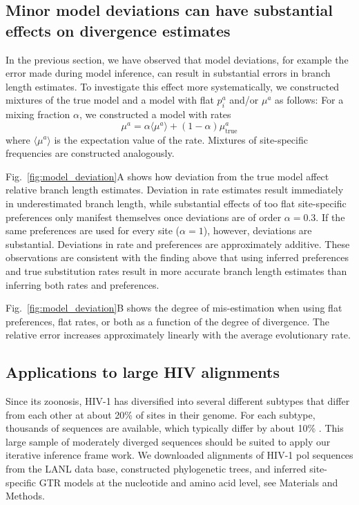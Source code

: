 \documentclass[aps,rmp,twocolumn,linenumbers]{revtex4-1}
\newcommand{\eqp}{p}
\begin{document}
\subsection*{Minor model deviations can have substantial effects on divergence estimates}
In the previous section, we have observed that model deviations, for example the error made during model inference, can result in substantial errors in branch length estimates.
To investigate this effect more systematically, we constructed mixtures of the true model and a model with flat $\eqp_i^a$ and/or $\mu^a$ as follows:
For a mixing fraction $\alpha$, we constructed a model with rates
\begin{equation}
\label{eq:mixture_model}
	\mu^a = \alpha \langle \mu^a\rangle + (1-\alpha) \mu^a_{\mathrm{true}}
\end{equation}
where $\langle \mu^a\rangle$ is the expectation value of the rate.
Mixtures of site-specific frequencies are constructed analogously.

Fig.~\ref{fig:model_deviation}A shows how deviation from the true model affect relative branch length estimates.
Deviation in rate estimates result immediately in underestimated branch length, while substantial effects of too flat site-specific preferences only manifest themselves once deviations are of order $\alpha = 0.3$.
If the same preferences are used for every site ($\alpha=1$), however, deviations are substantial.
Deviations in rate and preferences are approximately additive.
These observations are consistent with the finding above that using inferred preferences and true substitution rates result in more accurate branch length estimates than inferring both rates and preferences.

Fig.~\ref{fig:model_deviation}B shows the degree of mis-estimation when using flat preferences, flat rates, or both as a function of the degree of divergence.
The relative error increases approximately linearly with the average evolutionary rate.


\subsection*{Applications to large HIV alignments}
Since its zoonosis, HIV-1 has diversified into several different subtypes that differ from each other at about 20\% of sites in their genome.
For each subtype, thousands of sequences are available, which typically differ by about 10\% \citep{LANL}.
This large sample of moderately diverged sequences should be suited to apply our iterative inference frame work.
We downloaded alignments of HIV-1 pol sequences from the LANL data base, constructed phylogenetic trees, and inferred site-specific GTR models at the nucleotide and amino acid level, see Materials and Methods.
\end{document}
